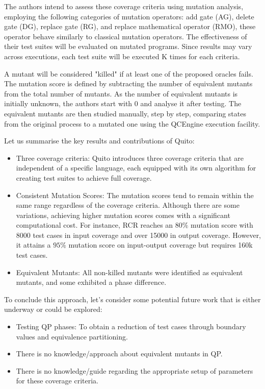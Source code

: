 \begin{itemize}
The authors intend to assess these coverage criteria using mutation analysis, employing the following categories of mutation operators: add gate (AG), delete gate (DG), replace gate (RG), and replace mathematical operator (RMO), these operator behave similarly to classical mutation operators. The effectiveness of their test suites will be evaluated on mutated programs. Since results may vary across executions, each test suite will be executed K times for each criteria.\newline

A mutant will be considered "killed" if at least one of the proposed oracles fails. The mutation score is defined by subtracting the number of equivalent mutants from the total number of mutants. As the number of equivalent mutants is initially unknown, the authors start with 0 and analyse it after testing. The equivalent mutants are then studied manually, step by step, comparing states from the original process to a mutated one using the QCEngine execution facility.\newline

Let us summarise the key results and contributions of Quito:
\begin{itemize}
    \item Three coverage criteria: Quito introduces three coverage criteria that are independent of a specific language, each equipped with its own algorithm for creating test suites to achieve full coverage.
    \item Consistent Mutation Scores: The mutation scores tend to remain within the same range regardless of the coverage criteria. Although there are some variations, achieving higher mutation scores comes with a significant computational cost. For instance, RCR reaches an $80\%$ mutation score with 8000 test cases in input coverage and over 15000 in output coverage. However, it attains a $95\%$ mutation score on input-output coverage but requires 160k test cases.
    \item Equivalent Mutants: All non-killed mutants were identified as equivalent mutants, and some exhibited a phase difference.
\end{itemize}

To conclude this approach, let's consider some potential future work that is either underway or could be explored:

\begin{itemize}
    \item Testing QP phases: To obtain a reduction of test cases through boundary values and equivalence partitioning.
    \item There is no knowledge/approach about equivalent mutants in QP.
    \item There is no knowledge/guide regarding the appropriate setup of parameters for these coverage criteria.
\end{itemize}


\end{itemize}
